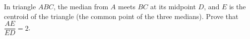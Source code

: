 In triangle $ABC$, the median from $A$ meets $BC$ at its midpoint $D$, and $E$ is the centroid of the triangle (the common point of the three medians). Prove that $\dfrac{AE}{ED}=2$.

